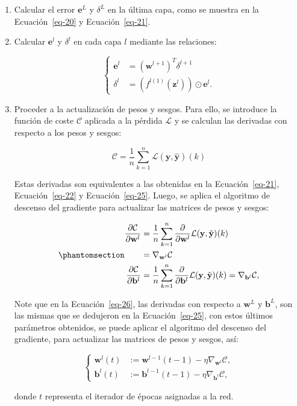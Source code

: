 \documentclass[
  us-letterpaper,
]{scrreprt}
\theoremstyle{definition}
\theoremstyle{plain}
\theoremstyle{plain}
\theoremstyle{definition}
\theoremstyle{remark}
\begin{document}
\begin{enumerate}
\def\labelenumi{\arabic{enumi}.}
\item
  Calcular el error \(\mathbf e^L\) y \(\delta^L\) en la última capa,
  como se muestra en la Ecuación~\ref{eq-20} y Ecuación~\ref{eq-21}.
\item
  Calcular \(\mathbf e^l\) y \(\delta^l\) en cada capa \(l\) mediante
  las relaciones:

  \[
  \begin{cases}\mathbf e^l&= (\mathbf w^{l+1})^T\delta^{l+1}\\ \delta^l &= (f^{l(1)}(\mathbf z^l))\odot \mathbf e^l.\end{cases}
  \]
\item
  Proceder a la actualización de pesos y sesgos. Para ello, se introduce
  la función de coste \(\mathcal C\) aplicada a la pérdida
  \(\mathcal L\) y se calculan las derivadas con respecto a los pesos y
  sesgos:

  \[
  \mathcal C=\frac{1}{n}\sum_{k=1}^n \mathcal L(\mathbf y, \mathbf{\hat{y}})(k)
  \]

  Estas derivadas son equivalentes a las obtenidas en la
  Ecuación~\ref{eq-21}, Ecuación~\ref{eq-22} y Ecuación~\ref{eq-25}.
  Luego, se aplica el algoritmo de descenso del gradiente para
  actualizar las matrices de pesos y sesgos:

  \begin{equation}\phantomsection\label{eq-26}{
  \begin{split}\frac{\partial \mathcal C}{\partial \mathbf w^l}&=\frac{1}{n}\sum_{k=1}^n \frac{\partial}{\partial \mathbf w^l}\mathcal L(\mathbf y, \hat{\mathbf y})(k)\\ &=\nabla_{\mathbf w^l}\mathcal C\\ 
  \frac{\partial\mathcal C}{\partial\mathbf b^l}&= \frac{1}{n}\sum_{k=1}^n \frac{\partial}{\partial \mathbf b^l}\mathcal L(\mathbf y, \hat{\mathbf y})(k)=\nabla_{\mathbf b^l}\mathcal C,\end{split}
  }\end{equation}

  Note que en la Ecuación~\ref{eq-26}, las derivadas con respecto a
  \(\mathbf w^L\) y \(\mathbf b^L\), son las mismas que se dedujeron en
  la Ecuación~\ref{eq-25}, con estos últimos parámetros obtenidos, se
  puede aplicar el algoritmo del descenso del gradiente, para actualizar
  las matrices de pesos y sesgos, así:

  \[
  \begin{cases}\mathbf w^l(t)&:= \mathbf w^{l-1}(t-1)-\eta\nabla_{\mathbf w^l}\mathcal C,\\ \mathbf b^l(t)&:= \mathbf b^{l-1}(t-1)-\eta\nabla_{\mathbf b^l}\mathcal C,\end{cases}
  \]

  donde \(t\) representa el iterador de épocas asignadas a la red.
\end{enumerate}
\end{document}
